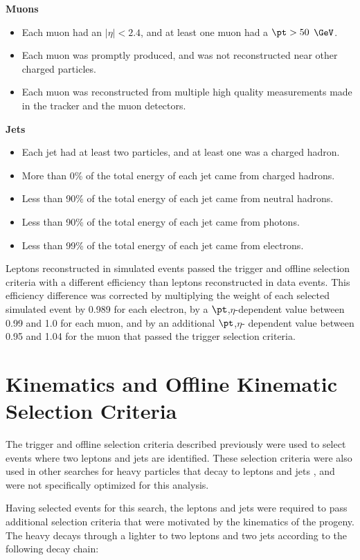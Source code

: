 \textbf{Muons}
\begin{itemize}
	\item Each muon had an $|\eta| < 2.4$, and at least one muon had a $\pt > 50$ $\GeV$.
	\item Each muon was promptly produced, and was not reconstructed near other charged particles.
	\item Each muon was reconstructed from multiple high quality measurements made in the tracker and the muon detectors.
\end{itemize}
\newline

\textbf{Jets}
\begin{itemize}
	\item Each jet had at least two particles, and at least one was a charged hadron.
	\item More than 0\% of the total energy of each jet came from charged hadrons.
	\item Less than 90\% of the total energy of each jet came from neutral hadrons.
	\item Less than 90\% of the total energy of each jet came from photons.
	\item Less than 99\% of the total energy of each jet came from electrons.
\end{itemize}

Leptons reconstructed in simulated events passed the trigger and offline selection criteria with a different efficiency than leptons 
reconstructed in data events.  This efficiency difference was corrected by multiplying the weight of each selected simulated event by 
0.989 for each electron, by a $\pt$,$\eta$-dependent value between 0.99 and 1.0 for each muon, and by an additional $\pt$,$\eta$-
dependent value between 0.95 and 1.04 for the muon that passed the trigger selection criteria.


\section{\WR Kinematics and Offline Kinematic Selection Criteria}
\label{sec:signalAndBkgnds}
The trigger and offline selection criteria described previously were used to select events where two leptons and jets are identified.  
These selection criteria were also used in other searches for heavy particles that decay to leptons and jets \cite{exoLeptJetResults}, 
and were not specifically optimized for this analysis.

Having selected events for this search, the leptons and jets were required to pass additional selection criteria that were motivated by 
the kinematics of the \WR progeny.  The heavy \WR decays through a lighter \nul to two leptons and two jets according to the following 
decay chain:

